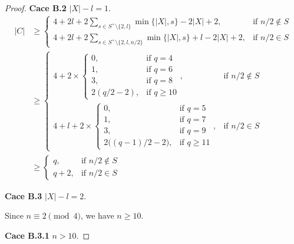 \documentclass{article}
\begin{document}
\begin{proof}
{\bf Cace B.2}  $|X|- l=1$.
\begin{align*}
|C| &\geq 
\begin{cases}
\displaystyle 4 + 2l+2\sum_{s\in S^+\setminus\{2,l\}} \min\{|X|,s\}-2|X|+2, & \text{if } n/2\notin S \\[4pt]
\displaystyle 4 +2l+ 2\sum_{s\in S^+\setminus\{2,l,n/2\}} \min\{|X|,s\}+ l-2|X|+2, & \text{if } n/2\in S
\end{cases} \\
&\geq 
\begin{cases}
\displaystyle 4 + 2\times
\begin{cases}
0, & \text{if } q=4 \\
1, & \text{if } q=6 \\
3, & \text{if } q=8 \\
2(q/2-2), & \text{if } q\ge 10
\end{cases}, & \text{if } n/2\notin S \\[4pt]
\displaystyle 4+ l + 2\times
\begin{cases}
0, & \text{if } q=5 \\
1, & \text{if } q=7 \\
3, & \text{if } q=9 \\
2\big((q-1)/2-2\big), & \text{if } q\ge 11
\end{cases}, & \text{if } n/2\in S
\end{cases} \\
&\geq 
\begin{cases}
\displaystyle q, & \text{if } n/2\notin S \\[4pt]
\displaystyle q+2, & \text{if } n/2\in S
\end{cases}
\end{align*}

{\bf Cace B.3}  $|X|- l=2$.

Since $n \equiv 2 \pmod{4}$, we have $n \ge 10$.

{\bf Cace B.3.1}  $n>10$.


\end{proof}
\end{document}
